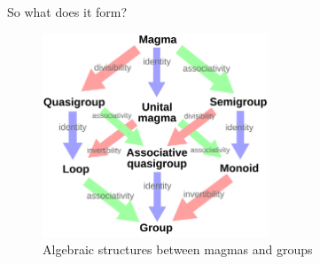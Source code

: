 \documentclass{beamer}
\begin{document}

\begin{frame}{So what does it form?}
    \begin{figure}
        \includegraphics[width=0.6\textwidth]{algebraic_structures.png}
        \caption{\label{fig:algebraic-structures-2}Algebraic structures between magmas and groups \cite{ethaniel_english_2020}}
    \end{figure}
\end{frame}
\end{document}
